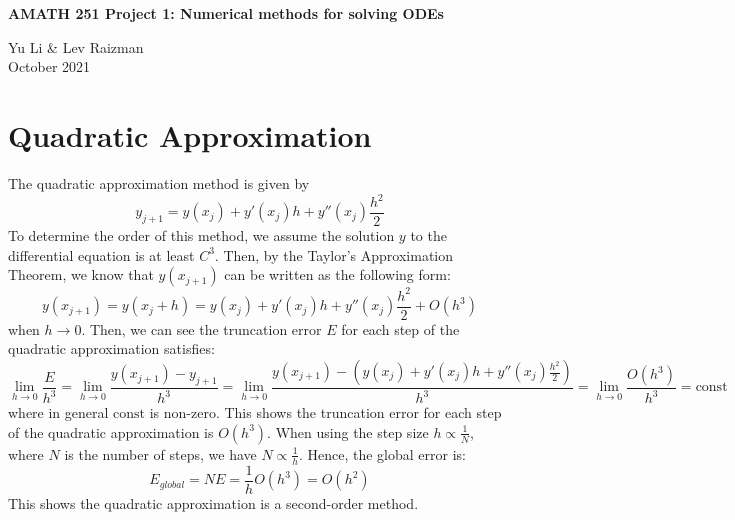 \documentclass{article}
\begin{document}
\begin{titlepage}
    \centering
    \vspace*{\fill}

    \vspace*{0.5cm}

    \huge\bfseries
    AMATH 251 Project 1: Numerical methods for solving ODEs

    \vspace*{0.5cm}

    \large Yu Li \& Lev Raizman \\
    October 2021

    \vspace*{\fill}

\end{titlepage}
\section{Quadratic Approximation}
The quadratic approximation method is given by
\begin{equation}
    y_{j+1} =  y(x_j) +y'(x_j)h + y''(x_j) \frac{h^2}{2}
\end{equation}
To determine the order of this method,
we assume the solution \(y\) to the differential equation is at least \(C^3\). Then, by the Taylor’s Approximation Theorem,
we know that \(y(x_{j+1})\) can be written as the following form:
\begin{equation}
  y(x_{j+1}) = y(x_j +h) = y(x_j) +y'(x_j)h + y''(x_j) \frac{h^2}{2} + O(h^3)
\end{equation}
when \(h\to 0\).
Then, we can see the truncation error \(E\) for each step of the quadratic approximation satisfies:
\begin{equation}
  \lim_{h\to 0}\frac{E}{h^3} =\lim_{h\to 0} \frac{y(x_{j+1}) - y_{j+1}}{h^3} = \lim_{h\to 0}\frac{  y(x_{j+1}) - ( y(x_j) +y'(x_j)h + y''(x_j) \frac{h^2}{2})}{h^3} = \lim_{h\to 0} \frac{O(h^3)}{h^3} = \text{const}
\end{equation}
where in general \(\text{const}\) is non-zero. This shows the truncation error for each step of the quadratic approximation
is \(O(h^3)\). When using the step size \(h \propto \frac{1}{N}\), where \(N\) is the number of steps, we have \(N \propto \frac{1}{h}\). Hence, the global error is:
\begin{equation}
  E_{global} = N E  = \frac{1}{h} O(h^3) = O(h^2)
\end{equation}
This shows the quadratic approximation is a second-order method. \\
\end{document}
